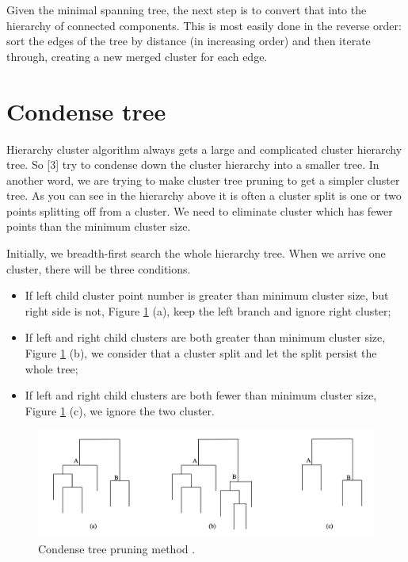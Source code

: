 \documentclass{article}
\begin{document}
	Given the minimal spanning tree, the next step is to convert that into the hierarchy of connected components. This is most easily done in the reverse order: sort the edges of the tree by distance (in increasing order) and then iterate through, creating a new merged cluster for each edge. 
	
	\section{Condense tree}
	
	Hierarchy cluster algorithm always gets a large and complicated cluster hierarchy tree. So [3] try to condense down the cluster hierarchy into a smaller tree. In another word, we are trying to make cluster tree pruning to get a simpler cluster tree. As you can see in the hierarchy above it is often a cluster split is one or two points splitting off from a cluster. We need to eliminate cluster which has fewer points than the minimum cluster size. 
	
	Initially, we breadth-first search the whole hierarchy tree. When we arrive one cluster, there will be three conditions.
	
	\begin{itemize}
		\item If left child cluster point number is greater than minimum cluster size, but right side is not, Figure \ref{fig:condtree} (a), keep the left branch and ignore right cluster;
		\item If left and right child clusters are both greater than minimum cluster size, Figure \ref{fig:condtree} (b), we consider that a cluster split and let the split persist the whole tree;
		\item If left and right child clusters are both fewer than minimum cluster size, Figure \ref{fig:condtree} (c), we ignore the two cluster.
	\end{itemize}
	
	\begin{figure}[h!]
		\centering
		\includegraphics[scale=0.45]{b.png}
		\caption{Condense tree pruning method .}
		\label{fig:condtree}
	\end{figure}
	
\end{document}
